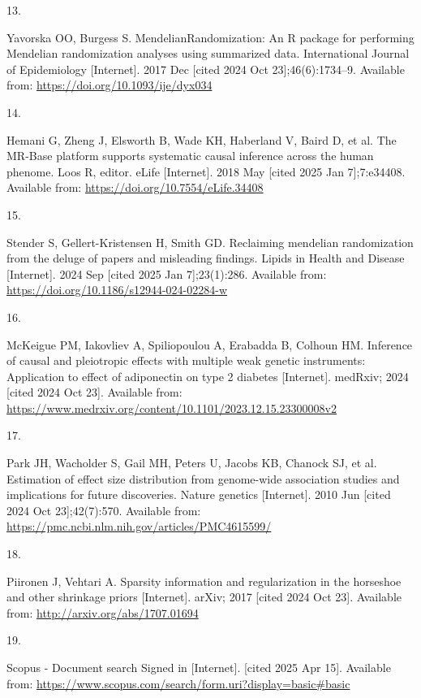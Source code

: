 \documentclass[
]{article}
\newlength{\cslhangindent}
\newlength{\csllabelwidth}
\newenvironment{CSLReferences}[2] %
 {\begin{list}{}{%
  \setlength{\itemindent}{0pt}
  \setlength{\leftmargin}{0pt}
  \setlength{\parsep}{0pt}
  \ifodd #1
   \setlength{\leftmargin}{\cslhangindent}
   \setlength{\itemindent}{-1\cslhangindent}
  \fi
  \setlength{\itemsep}{#2\baselineskip}}}
 {\end{list}}
\newcommand{\CSLLeftMargin}[1]{\parbox[t]{\csllabelwidth}{\strut#1\strut}}
\newcommand{\CSLRightInline}[1]{\parbox[t]{\linewidth - \csllabelwidth}{\strut#1\strut}}
\begin{document}
\begin{CSLReferences}{0}{1}
\CSLLeftMargin{13. }%
\CSLRightInline{Yavorska OO, Burgess S. {MendelianRandomization}: An {R} package for performing {Mendelian} randomization analyses using summarized data. International Journal of Epidemiology {[}Internet{]}. 2017 Dec {[}cited 2024 Oct 23{]};46(6):1734--9. Available from: \url{https://doi.org/10.1093/ije/dyx034}}

\CSLLeftMargin{14. }%
\CSLRightInline{Hemani G, Zheng J, Elsworth B, Wade KH, Haberland V, Baird D, et al. The {MR}-{Base} platform supports systematic causal inference across the human phenome. Loos R, editor. eLife {[}Internet{]}. 2018 May {[}cited 2025 Jan 7{]};7:e34408. Available from: \url{https://doi.org/10.7554/eLife.34408}}

\CSLLeftMargin{15. }%
\CSLRightInline{Stender S, Gellert-Kristensen H, Smith GD. Reclaiming mendelian randomization from the deluge of papers and misleading findings. Lipids in Health and Disease {[}Internet{]}. 2024 Sep {[}cited 2025 Jan 7{]};23(1):286. Available from: \url{https://doi.org/10.1186/s12944-024-02284-w}}

\CSLLeftMargin{16. }%
\CSLRightInline{McKeigue PM, Iakovliev A, Spiliopoulou A, Erabadda B, Colhoun HM. Inference of causal and pleiotropic effects with multiple weak genetic instruments: Application to effect of adiponectin on type 2 diabetes {[}Internet{]}. medRxiv; 2024 {[}cited 2024 Oct 23{]}. Available from: \url{https://www.medrxiv.org/content/10.1101/2023.12.15.23300008v2}}

\CSLLeftMargin{17. }%
\CSLRightInline{Park JH, Wacholder S, Gail MH, Peters U, Jacobs KB, Chanock SJ, et al. Estimation of effect size distribution from genome-wide association studies and implications for future discoveries. Nature genetics {[}Internet{]}. 2010 Jun {[}cited 2024 Oct 23{]};42(7):570. Available from: \url{https://pmc.ncbi.nlm.nih.gov/articles/PMC4615599/}}

\CSLLeftMargin{18. }%
\CSLRightInline{Piironen J, Vehtari A. Sparsity information and regularization in the horseshoe and other shrinkage priors {[}Internet{]}. arXiv; 2017 {[}cited 2024 Oct 23{]}. Available from: \url{http://arxiv.org/abs/1707.01694}}

\CSLLeftMargin{19. }%
\CSLRightInline{Scopus - {Document} search {\textbar} {Signed} in {[}Internet{]}. {[}cited 2025 Apr 15{]}. Available from: \url{https://www.scopus.com/search/form.uri?display=basic\#basic}}


\end{CSLReferences}
\end{document}
